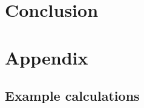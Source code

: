 \documentclass{article}
\begin{document}
\newpage
\section{Conclusion}
\newpage
\section{Appendix}
\subsection{Example calculations}
\end{document}
